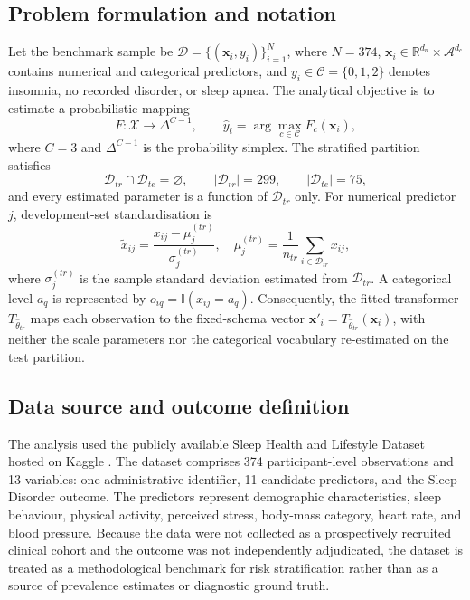 ﻿\documentclass[preprint,12pt]{elsarticle}
\begin{document}
\subsection{Problem formulation and notation}
Let the benchmark sample be $\mathcal{D}=\{(\mathbf{x}_i,y_i)\}_{i=1}^{N}$, where $N=374$, $\mathbf{x}_i\in\mathbb{R}^{d_n}\times\mathcal{A}^{d_c}$ contains numerical and categorical predictors, and $y_i\in\mathcal{C}=\{0,1,2\}$ denotes insomnia, no recorded disorder, or sleep apnea. The analytical objective is to estimate a probabilistic mapping
\begin{equation}
F:\mathcal{X}\rightarrow\Delta^{C-1},\qquad
\hat y_i=\arg\max_{c\in\mathcal{C}}F_c(\mathbf{x}_i),
\label{eq:problem}
\end{equation}
where $C=3$ and $\Delta^{C-1}$ is the probability simplex. The stratified partition satisfies
\begin{equation}
\mathcal{D}_{tr}\cap\mathcal{D}_{te}=\varnothing,
\qquad |\mathcal{D}_{tr}|=299,
\qquad |\mathcal{D}_{te}|=75,
\label{eq:partition}
\end{equation}
and every estimated parameter is a function of $\mathcal{D}_{tr}$ only. For numerical predictor $j$, development-set standardisation is
\begin{equation}
\widetilde{x}_{ij}=\frac{x_{ij}-\mu^{(tr)}_j}{\sigma^{(tr)}_j},
\quad
\mu^{(tr)}_j=\frac{1}{n_{tr}}\sum_{i\in\mathcal{D}_{tr}}x_{ij},
\label{eq:standardise}
\end{equation}
where $\sigma^{(tr)}_j$ is the sample standard deviation estimated from $\mathcal{D}_{tr}$. A categorical level $a_q$ is represented by $o_{iq}=\mathbb{I}(x_{ij}=a_q)$. Consequently, the fitted transformer $T_{\widehat{\theta}_{tr}}$ maps each observation to the fixed-schema vector $\mathbf{x}'_i=T_{\widehat{\theta}_{tr}}(\mathbf{x}_i)$, with neither the scale parameters nor the categorical vocabulary re-estimated on the test partition.

\subsection{Data source and outcome definition}
The analysis used the publicly available Sleep Health and Lifestyle Dataset hosted on Kaggle \cite{kaggle2023}. The dataset comprises 374 participant-level observations and 13 variables: one administrative identifier, 11 candidate predictors, and the Sleep Disorder outcome. The predictors represent demographic characteristics, sleep behaviour, physical activity, perceived stress, body-mass category, heart rate, and blood pressure. Because the data were not collected as a prospectively recruited clinical cohort and the outcome was not independently adjudicated, the dataset is treated as a methodological benchmark for risk stratification rather than as a source of prevalence estimates or diagnostic ground truth.
\end{document}
